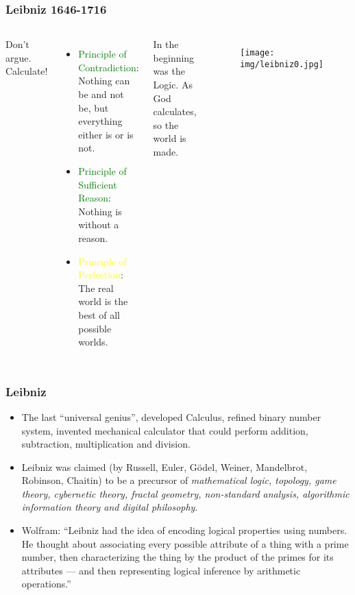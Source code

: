 \documentclass[UTF8,11pt,colorlinks,compress,openany]{beamer}%
\begin{document}
\begin{frame}\frametitle{Leibniz 1646-1716}
	\begin{columns}
			\begin{block}{}
				\centerline{\Large Don't argue. Calculate!}
			\end{block}
			\begin{itemize}
				\item \textcolor{green}{{\small Principle of Contradiction}}: Nothing can be and not be, but everything either is or is not.
				\item \textcolor{green}{{\small Principle of Sufficient Reason}}: Nothing is without a reason.
				\item \textcolor{yellow}{{\small Principle of Perfection}}: The real world is the best of all possible worlds.
			\end{itemize}
			\begin{block}{In the beginning was the Logic.}
				As God calculates, so the world is made.
			\end{block}
			\begin{figure}
				\texttt{[image: img/leibniz0.jpg]}
			\end{figure}
	\end{columns}
\end{frame}

\begin{frame}\frametitle{Leibniz}
	\begin{itemize}
		\item The last ``universal genius'', developed Calculus, refined binary number system, invented mechanical calculator that could perform addition, subtraction, multiplication and division.
		\item Leibniz was claimed (by Russell, Euler, G\"odel, Weiner, Mandelbrot, Robinson, Chaitin) to be a precursor of \emph{mathematical logic, topology, game theory, cybernetic theory, fractal geometry, non-standard analysis, algorithmic information theory and digital philosophy}.
		\item Wolfram: ``Leibniz had the idea of encoding logical properties using numbers. He thought about associating every possible attribute of a thing with a prime number, then characterizing the thing by the product of the primes for its attributes --- and then representing logical inference by arithmetic operations.''
	\end{itemize}
\end{frame}
\end{document}
